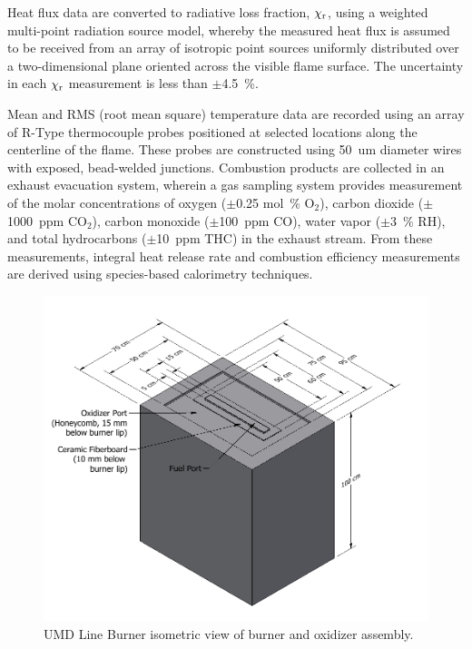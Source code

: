 Heat flux data are converted to radiative loss fraction, $\chi_{\rm r}$, using a weighted multi-point radiation source model, whereby the measured heat flux is assumed to be received from an array of isotropic point sources uniformly distributed over a two-dimensional plane oriented across the visible flame surface. The uncertainty in each $\chi_{\rm r}$ measurement is less than $\pm$4.5~\%.

Mean and RMS (root mean square) temperature data are recorded using an array of R-Type thermocouple probes positioned at selected locations along the centerline of the flame. These probes are constructed using 50~um diameter wires with exposed, bead-welded junctions. Combustion products are collected in an exhaust evacuation system, wherein a gas sampling system provides measurement of the molar concentrations of oxygen ($\pm$0.25 mol~\% O$_2$), carbon dioxide ($\pm$1000~ppm CO$_2$), carbon monoxide ($\pm$100~ppm CO), water vapor ($\pm$3~\% RH), and total hydrocarbons ($\pm$10~ppm THC) in the exhaust stream. From these measurements, integral heat release rate and combustion efficiency measurements are derived using species-based calorimetry techniques.

\begin{figure}[!ht]
\centering
\includegraphics[width=\textwidth]{FIGURES/UMD_Line_Burner/UMD_Gas_Burner}
\caption[UMD Line Burner isometric view of burner and oxidizer assembly]{UMD Line Burner isometric view of burner and oxidizer assembly.}
\label{fig:umd_line_burner_plan_view}
\end{figure}

